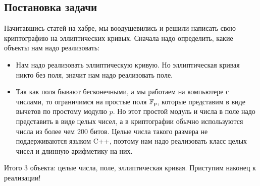 \subsection{Постановка задачи}
Начитавшись статей на хабре, мы воодушевились и решили написать свою криптографию на эллиптических кривых. Сначала надо определить, какие объекты нам надо реализовать:
\begin{itemize}
  \item Нам надо реализовать эллиптическую кривую. Но эллиптическая кривая никто без поля, значит нам надо реализовать поле.
  \item Так как поля бывают бесконечными, а мы работаем на компьютере с числами, то ограничимся на простые поля $\mathbb F_p$, которые представим в виде вычетов по простому модулю $p$. Но этот простой модуль и числа в поле надо представить в виде целых чисел, а в криптографии обычно используются числа из более чем 200 битов. Целые числа такого размера не поддерживаются языком C++, поэтому нам надо реализовать класс целых чисел и длинную арифметику на них.
\end{itemize}

Итого 3 объекта: целые числа, поле, эллиптическая кривая. Приступим наконец к реализации!

